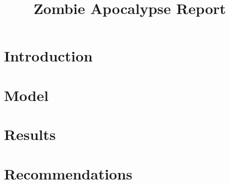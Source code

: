 \documentclass[a4paper]{article}
\title{Zombie Apocalypse Report}
\begin{document}
\maketitle

\section{Introduction} %

\section{Model} %

\section{Results}

\section{Recommendations}
\end{document}
